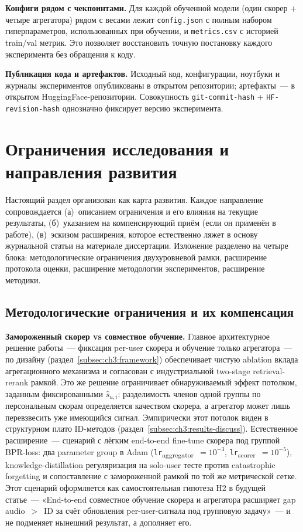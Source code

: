 \textbf{Конфиги рядом с чекпоинтами.} Для каждой обученной модели (один скорер + четыре агрегатора) рядом с весами лежит \texttt{config.json} с полным набором гиперпараметров, использованных при обучении, и \texttt{metrics.csv} с историей train/val метрик. Это позволяет восстановить точную постановку каждого эксперимента без обращения к коду.

\textbf{Публикация кода и артефактов.} Исходный код, конфигурации, ноутбуки и журналы экспериментов опубликованы в открытом репозитории; артефакты~--- в открытом HuggingFace-репозитории. Совокупность \texttt{git-commit-hash} + \texttt{HF-revision-hash} однозначно фиксирует версию эксперимента.

\section{Ограничения исследования и направления развития}\label{sec:ch3:limitations}

Настоящий раздел организован как карта развития. Каждое направление сопровождается (а)~описанием ограничения и его влияния на текущие результаты, (б)~указанием на компенсирующий приём (если он применён в работе), (в)~эскизом расширения, которое естественно ляжет в основу журнальной статьи на материале диссертации. Изложение разделено на четыре блока: методологические ограничения двухуровневой рамки, расширение протокола оценки, расширение методологии экспериментов, расширение методики.

\subsection{Методологические ограничения и их компенсация}\label{subsec:ch3:lim-methodology}

\textbf{Замороженный скорер vs совместное обучение.} Главное архитектурное решение работы~--- фиксация per-user скорера и обучение только агрегатора~--- по дизайну (раздел~\ref{subsec:ch3:framework}) обеспечивает чистую ablation вклада агрегационного механизма и согласован с индустриальной two-stage retrieval-rerank рамкой. Это же решение ограничивает обнаруживаемый эффект потолком, заданным фиксированными $\hat{s}_{u, i}$: разделимость членов одной группы по персональным скорам определяется качеством скорера, а агрегатор может лишь перевзвесить уже имеющийся сигнал. Эмпирически этот потолок виден в структурном плато ID-методов (раздел~\ref{subsec:ch3:results-discuss}). Естественное расширение~--- сценарий с лёгким end-to-end fine-tune скорера под группой BPR-loss: два parameter group в Adam (\texttt{lr}\textsubscript{aggregator}~$=10^{-3}$, \texttt{lr}\textsubscript{scorer}~$=10^{-5}$), knowledge-distillation регуляризация на solo-user тесте против catastrophic forgetting и сопоставление с замороженной рамкой по той же метрической сетке. Этот сценарий оформляется как самостоятельная гипотеза H2 в будущей статье~--- «End-to-end совместное обучение скорера и агрегатора расширяет gap audio~$>$~ID за счёт обновления per-user-сигнала под групповую задачу»~--- и не подменяет нынешний результат, а дополняет его.

